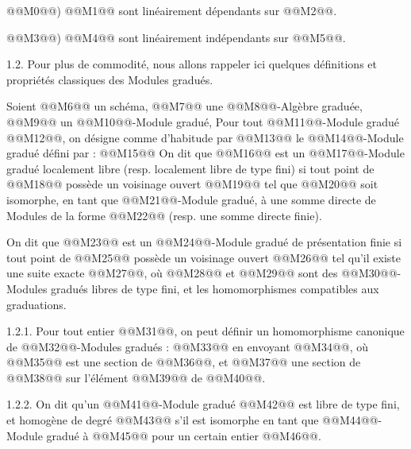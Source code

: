 
@@M0@@) @@M1@@
sont linéairement dépendants sur @@M2@@.

@@M3@@) @@M4@@ sont linéairement indépendants sur @@M5@@.

1.2.
Pour plus de commodité, nous allons rappeler ici quelques définitions et propriétés classiques des Modules gradués.

Soient @@M6@@ un schéma, @@M7@@ une @@M8@@-Algèbre graduée, @@M9@@ un @@M10@@-Module gradué, Pour tout @@M11@@-Module gradué @@M12@@, on désigne comme d'habitude par @@M13@@ le @@M14@@-Module gradué défini par :
@@M15@@
On dit que @@M16@@ est un @@M17@@-Module gradué localement libre (resp. localement libre de type fini) si tout point de @@M18@@ possède un voisinage ouvert @@M19@@ tel que @@M20@@ soit isomorphe, en tant que @@M21@@-Module gradué, à une somme directe de Modules de la forme @@M22@@ (resp. une somme directe finie).

On dit que @@M23@@ est un @@M24@@-Module gradué de présentation finie si tout point de @@M25@@ possède un voisinage ouvert @@M26@@ tel qu'il existe une suite exacte @@M27@@, où @@M28@@ et @@M29@@ sont des @@M30@@-Modules gradués libres de type fini, et les homomorphismes compatibles aux graduations.

1.2.1. Pour tout entier @@M31@@, on peut définir un homomorphisme canonique de @@M32@@-Modules gradués :
@@M33@@
en envoyant @@M34@@, où @@M35@@ est une section de @@M36@@, et @@M37@@ une section de @@M38@@ sur l'élément @@M39@@ de @@M40@@.

1.2.2. On dit qu'un @@M41@@-Module gradué @@M42@@ est libre de type fini, et homogène de degré @@M43@@ s'il est isomorphe en tant que @@M44@@-Module gradué à @@M45@@ pour un certain entier @@M46@@.

